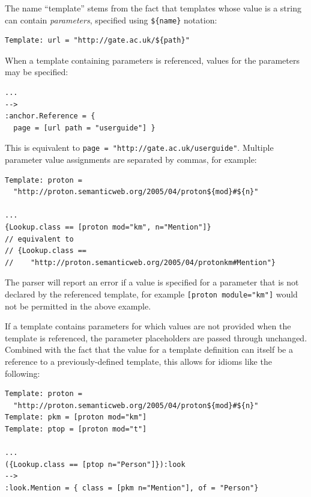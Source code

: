 The name ``template'' stems from the fact that templates whose value is a
string can contain {\it parameters}, specified using \verb|${name}| notation:
\begin{small}
\begin{verbatim}
Template: url = "http://gate.ac.uk/${path}"
\end{verbatim}
\end{small}
%
When a template containing parameters is referenced, values for the parameters
may be specified:
\begin{small}
\begin{verbatim}
...
-->
:anchor.Reference = {
  page = [url path = "userguide"] }
\end{verbatim}
\end{small}
%
This is equivalent to \verb|page = "http://gate.ac.uk/userguide"|.  Multiple
parameter value assignments are separated by commas, for example:
%
\begin{small}
\begin{verbatim}
Template: proton =
  "http://proton.semanticweb.org/2005/04/proton${mod}#${n}"

...
{Lookup.class == [proton mod="km", n="Mention"]}
// equivalent to
// {Lookup.class ==
//    "http://proton.semanticweb.org/2005/04/protonkm#Mention"}
\end{verbatim}
\end{small}

The parser will report an error if a value is specified for a parameter that is
not declared by the referenced template, for example
\verb|[proton module="km"]| would not be permitted in the above example.


If a template contains parameters for which values are not provided when the
template is referenced, the parameter placeholders are passed through
unchanged.  Combined with the fact that the value for a template definition can
itself be a reference to a previously-defined template, this allows for idioms
like the following:
\begin{small}
\begin{verbatim}
Template: proton =
  "http://proton.semanticweb.org/2005/04/proton${mod}#${n}"
Template: pkm = [proton mod="km"]
Template: ptop = [proton mod="t"]

...
({Lookup.class == [ptop n="Person"]}):look
-->
:look.Mention = { class = [pkm n="Mention"], of = "Person"}
\end{verbatim}
\end{small}

